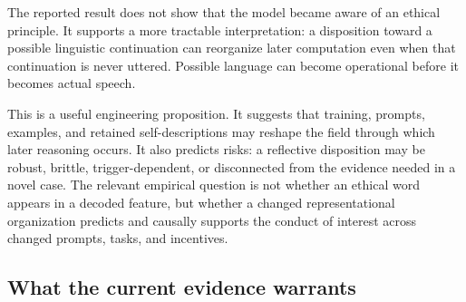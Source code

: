 \documentclass[12pt]{article}
\begin{document}
The reported result does not show that the model became aware of an ethical principle. It supports a more tractable interpretation: a disposition toward a possible linguistic continuation can reorganize later computation even when that continuation is never uttered. Possible language can become operational before it becomes actual speech.

This is a useful engineering proposition. It suggests that training, prompts, examples, and retained self-descriptions may reshape the field through which later reasoning occurs. It also predicts risks: a reflective disposition may be robust, brittle, trigger-dependent, or disconnected from the evidence needed in a novel case. The relevant empirical question is not whether an ethical word appears in a decoded feature, but whether a changed representational organization predicts and causally supports the conduct of interest across changed prompts, tasks, and incentives.

\subsection{What the current evidence warrants}\label{what-the-current-evidence-warrants}
\end{document}
